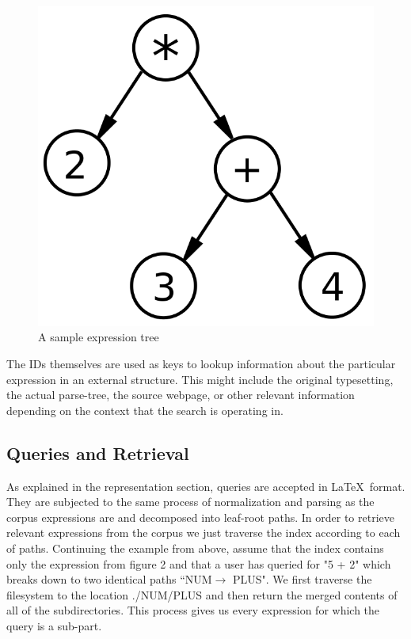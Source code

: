 \documentclass{sig-alternate}
\begin{document}
\begin{figure}
    \label{fig2}
	\centering
    \includegraphics[scale=0.2]{exprtree}
	\caption{A sample expression tree}
\end{figure}

The IDs themselves are used as keys to lookup information about the particular expression in an external structure. This might include the original typesetting, the actual parse-tree, the source webpage, or other relevant information depending on the context that the search is operating in.

\subsection{Queries and Retrieval}
As explained in the representation section, queries are accepted in \LaTeX\, format. They 
are subjected to the same process of normalization and parsing as the corpus expressions
are and decomposed into leaf-root paths. In order to retrieve relevant expressions from the corpus
we just traverse the index according to each of paths. Continuing the example from above, assume that
the index contains only the expression from figure 2 and that a user has queried for "5 + 2" which 
breaks down to two identical paths ``NUM$\rightarrow$ PLUS". We first traverse the filesystem to the location
./NUM/PLUS and then return the merged contents of all of the subdirectories. This process gives us every expression for which the query is a sub-part. 
\end{document}
